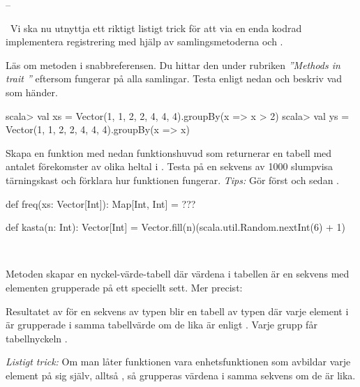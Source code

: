 \TaskSolved --

\QUESTEND



\AdvancedTasks %



\QUESTBEGIN

\Task \what~Vi ska nu utnyttja ett riktigt listigt trick för att via en enda kodrad implementera registrering med hjälp av samlingsmetoderna  och .

\Subtask Läs om metoden  i snabbreferensen. Du hittar den under rubriken \emph{''Methods in trait ''} eftersom  fungerar på alla samlingar. Testa  enligt nedan och beskriv vad som händer.

\begin{REPL}
scala> val xs = Vector(1, 1, 2, 2, 4, 4, 4).groupBy(x => x > 2)
scala> val ys = Vector(1, 1, 2, 2, 4, 4, 4).groupBy(x => x)
\end{REPL}

\Subtask Skapa en funktion  med nedan funktionshuvud som returnerar en tabell med antalet förekomster av olika heltal i . Testa  på en sekvens av 1000 slumpvisa tärningskast och förklara hur funktionen  fungerar. \emph{Tips:} Gör först  och sedan .

\begin{Code}
def freq(xs: Vector[Int]): Map[Int, Int] = ???

def kasta(n: Int): Vector[Int] =
  Vector.fill(n)(scala.util.Random.nextInt(6) + 1)
\end{Code}

\SOLUTION

\TaskSolved \what~

\SubtaskSolved Metoden  skapar en nyckel-värde-tabell där värdena i tabellen är en sekvens med elementen grupperade på ett speciellt sett.
Mer precist:

Resultatet av  för en sekvens  av typen  blir en tabell av typen  där varje element  i  är grupperade i samma tabellvärde om de lika är enligt . Varje grupp får tabellnyckeln .

\emph{Listigt trick:} Om man låter funktionen  vara enhetsfunktionen som avbildar varje element på sig själv, alltså , så grupperas värdena i samma sekvens om de är lika.

